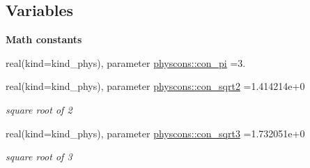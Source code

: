\subsection*{Variables}
\begin{Indent}{\bf Math constants}\par
\begin{DoxyCompactItemize}
\item 
real(kind=kind\+\_\+phys), parameter \hyperlink{namespacephyscons_aeb280391512de20933b4af3593a8ba38}{physcons\+::con\+\_\+pi} =3.
\item 
real(kind=kind\+\_\+phys), parameter \hyperlink{namespacephyscons_a2cf7f8b3a5721fe3b0be2afe5f19a352}{physcons\+::con\+\_\+sqrt2} =1.\+414214e+0
\begin{DoxyCompactList}\small\item\em square root of 2 \end{DoxyCompactList}\item 
real(kind=kind\+\_\+phys), parameter \hyperlink{namespacephyscons_ac8a4f35ffde9c6d239cd11a9158e4cc6}{physcons\+::con\+\_\+sqrt3} =1.\+732051e+0
\begin{DoxyCompactList}\small\item\em square root of 3 \end{DoxyCompactList}\end{DoxyCompactItemize}
\end{Indent}
